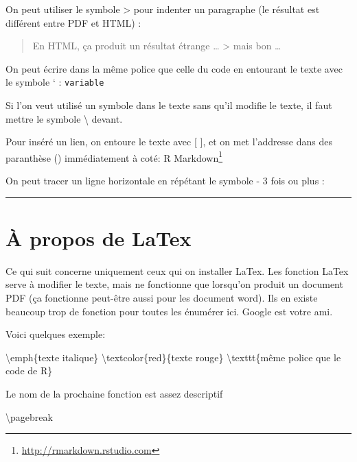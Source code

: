 \documentclass[12pt,]{book}
\newenvironment{Shaded}{\begin{snugshade}}{\end{snugshade}}
\newcommand{\FunctionTok}[1]{\textcolor[rgb]{0,0,0}{#1}}
\newcommand{\NormalTok}[1]{#1}
\renewcommand{\href}[2]{#2\footnote{\url{#1}}}
\begin{document}
On peut utiliser le symbole \textgreater{} pour indenter un paragraphe (le résultat est différent entre PDF et HTML) :

\begin{quote}
En HTML, ça produit un résultat étrange \ldots{}
\textgreater{} mais bon \ldots{}
\end{quote}

On peut écrire dans la même police que celle du code en entourant le texte avec le symbole ` :
\texttt{variable}

Si l'on veut utilisé un symbole dans le texte sans qu'il modifie le texte, il faut mettre le symbole \textbackslash{} devant.

Pour inséré un lien, on entoure le texte avec {[} {]}, et on met l'addresse dans des paranthèse () immédiatement à coté:
\href{http://rmarkdown.rstudio.com}{R Markdown}

On peut tracer un ligne horizontale en répétant le symbole - 3 fois ou plus :

\begin{center}\rule{0.5\linewidth}{0.5pt}\end{center}

\hypertarget{uxe0-propos-de-latex}{%
\section{À propos de LaTex}\label{uxe0-propos-de-latex}}

Ce qui suit concerne uniquement ceux qui on installer LaTex.
Les fonction LaTex serve à modifier le texte, mais ne fonctionne que lorsqu'on produit un document PDF (ça fonctionne peut-être aussi pour les document word). Ils en existe beaucoup trop de fonction pour toutes les énumérer ici. Google est votre ami.

Voici quelques exemple:

\begin{Shaded}
\begin{Highlighting}[]
\FunctionTok{\textbackslash{}emph}\NormalTok{\{texte italique\}}
\FunctionTok{\textbackslash{}textcolor}\NormalTok{\{red\}\{texte rouge\}}
\FunctionTok{\textbackslash{}texttt}\NormalTok{\{même police que le code de R\}}
\end{Highlighting}
\end{Shaded}

Le nom de la prochaine fonction est assez descriptif

\begin{Shaded}
\begin{Highlighting}[]
\FunctionTok{\textbackslash{}pagebreak}
\end{Highlighting}
\end{Shaded}
\end{document}
